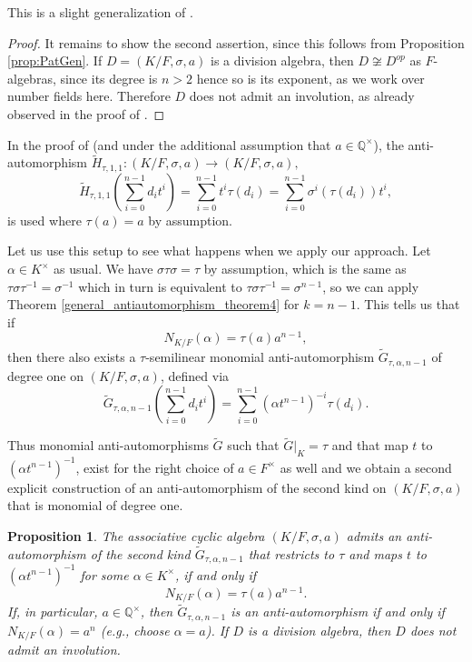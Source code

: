 \documentclass{amsart}
\theoremstyle{plain}
\newtheorem{proposition}[theorem]{Proposition}
\theoremstyle{definition}
\numberwithin{equation}{section}
\numberwithin{figure}{section}
\begin{document}
This is a slight generalization of \cite[Proposition 3.4]{MST}.

 \begin{proof}
It remains to show the second assertion, since this follows from Proposition \ref{prop:PatGen}.
  If $D=(K/F,\sigma,a)$ is a division algebra, then $D\not\cong D^{op}$ as $F$-algebras, since its degree is $n>2$ hence so is its exponent, as we work over number fields here. Therefore $D$ does not admit an involution, as already observed in the proof of \cite[Proposition 3.4]{MST}.
 \end{proof}



   In  the proof of \cite[Proposition 3.4]{MST} (and under the additional assumption that  $a\in \mathbb{Q}^\times$),  the anti-automorphism $\widetilde H_{\tau,1,1}:(K/F,\sigma,a) \to (K/F,\sigma,a),$
 $$\widetilde H_{\tau,1,1}(\sum_{i=0}^{n-1}d_it^i)=\sum_{i=0}^{n-1}  t^i \tau(d_i)=\sum_{i=0}^{n-1} \sigma^i(\tau(d_i) ) t^i,$$
 is used where $\tau(a)=a$ by assumption.


  Let us use this setup to see what happens when we apply our approach. Let $\alpha\in K^\times$ as usual.
  We have $\sigma\tau\sigma=\tau$ by assumption, which is the same as $\tau\sigma\tau^{-1}=\sigma^{-1}$ which in turn is equivalent to $\tau\sigma\tau^{-1}=\sigma^{n-1}$, so we can apply Theorem  \ref{general_antiautomorphism_theorem4} for $k=n-1$. This tells us that
   if
   $$N_{K/F}(\alpha)=\tau(a)a^{n-1},$$
  then there also exists a $\tau$-semilinear monomial anti-automorphism
 $\widetilde G_{\tau,\alpha,n-1}$ of degree one on $ (K/F,\sigma,a)$, defined via
 $$
\widetilde G_{\tau,\alpha,n-1} ( \sum_{i=0}^{n-1}d_it^i ) = \sum_{i=0}^{n-1} (\alpha t^{n-1})^{-i} \tau(d_i).
$$


 Thus monomial anti-automorphisms $\widetilde G$ such that $\widetilde G|_K=\tau$ and that  map $t$ to $(\alpha t^{n-1})^{-1}$,  exist for the right choice of $a\in F^\times$ as well and we obtain a second explicit construction of an anti-automorphism of the second kind on $(K/F,\sigma,a)$ that is monomial of degree one.
 

 \begin{proposition}\label{prop:Pat}
 The associative cyclic algebra $(K/F,\sigma,a)$ admits an anti-automorphism of the second kind $\widetilde G_{\tau,\alpha,n-1}$ that restricts to $\tau$ and maps $t$ to $(\alpha t^{n-1})^{-1}$ for some $\alpha\in K^\times$, if and only if
 $$N_{K/F}(\alpha)=\tau(a)a^{n-1}.$$
 If, in particular, $a\in \mathbb{Q}^\times$, then $\widetilde G_{\tau,\alpha,n-1}$ is an anti-automorphism if and only if $N_{K/F}(\alpha)=a^n$ (e.g., choose $\alpha=a$).
If $D$ is a division algebra, then $D$ does not admit an involution.
   \end{proposition}
\end{document}
